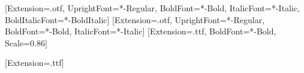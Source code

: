 \setmainfont{LibertinusSerif}[Extension=.otf, UprightFont=*-Regular, BoldFont=*-Bold, ItalicFont=*-Italic, BoldItalicFont=*-BoldItalic]
\setsansfont{LibertinusSans}[Extension=.otf, UprightFont=*-Regular, BoldFont=*-Bold, ItalicFont=*-Italic]
\setmonofont{DejaVuSansMono}[Extension=.ttf, BoldFont=*-Bold, Scale=0.86]
\usepackage{newunicodechar}
\newfontfamily{}[Extension=.ttf]
\usepackage[a4paper, inner=2.6cm, outer=2.4cm, top=2.6cm, bottom=2.8cm]{geometry}
\usepackage{xcolor}
\usepackage{titlesec}
\titleformat{\chapter}[display]{\normalfont\sffamily\bfseries\color{azul}\raggedright}{}{0pt}{\huge}
\titlespacing*{\chapter}{0pt}{-10pt}{28pt}
\titleformat{\section}{\normalfont\sffamily\bfseries\Large\color{azul}}{}{0pt}{}
\titleformat{\subsection}{\normalfont\sffamily\bfseries\large}{}{0pt}{}
\titleformat{\subsubsection}{\normalfont\sffamily\bfseries\normalsize}{}{0pt}{}
\usepackage{fancyhdr}
\pagestyle{fancy}\fancyhf{}
\fancyhead[LE]{\small\sffamily\leftmark}\fancyhead[RO]{\small\sffamily\rightmark}
\fancyfoot[C]{\small\thepage}
\renewcommand{\headrulewidth}{0.3pt}
\renewcommand{\chaptermark}[1]{\markboth{#1}{#1}}
\renewcommand{\sectionmark}[1]{\markright{#1}}
\usepackage{caption}
\captionsetup{labelformat=empty, font=small, labelfont=bf, justification=justified, singlelinecheck=false}
\captionsetup[table]{labelformat=empty}
\usepackage{float}
